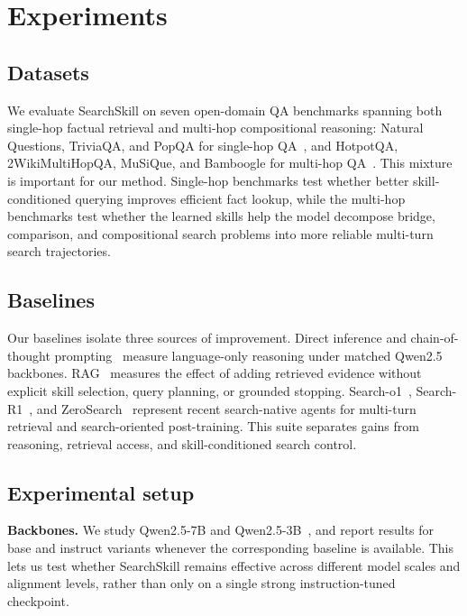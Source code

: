 \documentclass{article}
\begin{document}
\section{Experiments}
\subsection{Datasets}
We evaluate SearchSkill on seven open-domain QA benchmarks spanning both single-hop factual retrieval and multi-hop compositional reasoning: Natural Questions, TriviaQA, and PopQA for single-hop QA~\citep{kwiatkowski2019naturalquestions,joshi2017triviaqa,mallen2023popqa}, and HotpotQA, 2WikiMultiHopQA, MuSiQue, and Bamboogle for multi-hop QA~\citep{yang2018hotpotqa,ho2020wikimultihopqa,trivedi2022musique,press2023bamboogle}. This mixture is important for our method. Single-hop benchmarks test whether better skill-conditioned querying improves efficient fact lookup, while the multi-hop benchmarks test whether the learned skills help the model decompose bridge, comparison, and compositional search problems into more reliable multi-turn search trajectories.

\subsection{Baselines}
Our baselines isolate three sources of improvement. Direct inference and chain-of-thought prompting~\citep{wei2022cot} measure language-only reasoning under matched Qwen2.5 backbones. RAG~\citep{lewis2021rag} measures the effect of adding retrieved evidence without explicit skill selection, query planning, or grounded stopping. Search-o1~\citep{li2025searcho1}, Search-R1~\citep{jin2025searchr1}, and ZeroSearch~\citep{sun2025zerosearch} represent recent search-native agents for multi-turn retrieval and search-oriented post-training. This suite separates gains from reasoning, retrieval access, and skill-conditioned search control.

\subsection{Experimental setup}
\label{sec:experimental-setup}
\textbf{Backbones.} We study Qwen2.5-7B and Qwen2.5-3B~\citep{qwen2025qwen25}, and report results for base and instruct variants whenever the corresponding baseline is available. This lets us test whether SearchSkill remains effective across different model scales and alignment levels, rather than only on a single strong instruction-tuned checkpoint.
\end{document}
